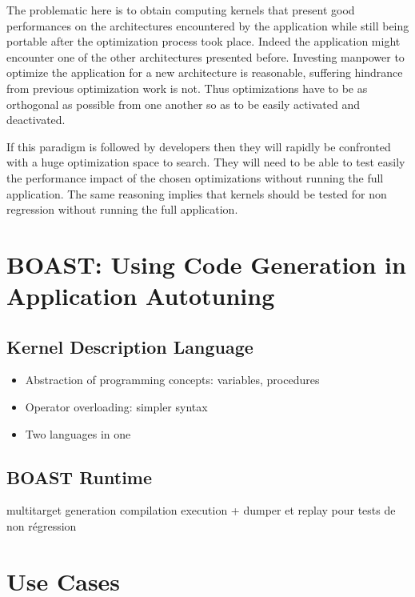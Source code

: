 \documentclass[review]{elsarticle}
\begin{document}
The problematic here is to obtain computing kernels that present good
performances on the architectures encountered by the application while
still being portable after the optimization process took place. Indeed the
application might encounter one of the other architectures presented
before. Investing manpower to optimize the application for a new
architecture is reasonable, suffering hindrance from previous optimization
work is not. Thus optimizations have to be as orthogonal as possible from
one another so as to be easily activated and deactivated.

If this paradigm is followed by developers then they will rapidly be
confronted with a huge optimization space to search. They will need to
be able to test easily the performance impact of the chosen optimizations
without running the full application. The same reasoning implies that
kernels should be tested for non regression without running the full
application.


\section{BOAST: Using Code Generation in Application Autotuning}

  \cite{videau2013boast}

  \subsection{Kernel Description Language}

  \begin{itemize}
  \item Abstraction of programming concepts: variables, procedures
  \item Operator overloading: simpler syntax
  \item Two languages in one
  \end{itemize}


  \subsection{BOAST Runtime}

   multitarget generation
   compilation
   execution
  + dumper et replay pour tests de non régression

\section{Use Cases}
\label{use_cases}
\end{document}
